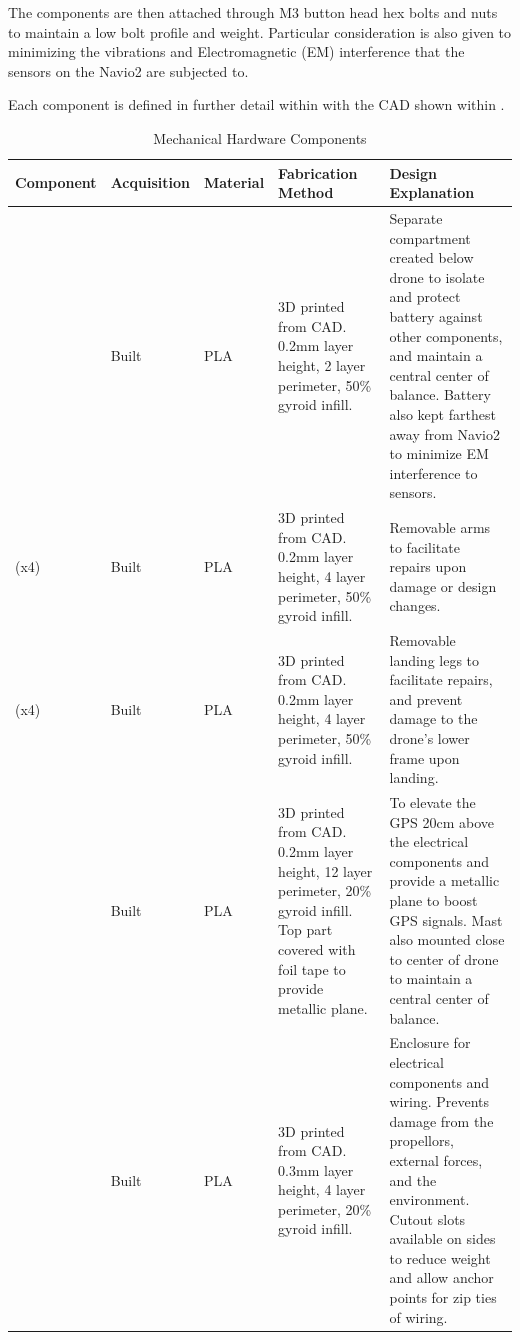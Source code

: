\documentclass[12pt, titlepage]{article}
\begin{document}
The components are then attached through M3 button head hex bolts and nuts to maintain a low bolt profile and weight.
Particular consideration is also given to minimizing the vibrations and Electromagnetic (EM) interference that the sensors on the Navio2 are subjected to.

Each component is defined in further detail within  with the CAD shown within .

\begin{landscape}
\begin{table}[!h]
\begin{center}
\caption {Mechanical Hardware Components}
\label{tab:MechHardware}
\begin{tabular}{ | m{2.7cm} | m{1.9cm} | m{1.4cm} | m{5.5cm} | m{10.3cm} | } 
\hline
Component & Acquisition & Material & Fabrication Method & Design Explanation \\
\hline
\nameref{Battery Compartment} & Built & PLA & 3D printed from CAD. 0.2mm layer height, 2 layer perimeter, 50\% gyroid infill. & 
    Separate compartment created below drone to isolate and protect battery against other components, and maintain a central center of balance. Battery also kept farthest away from Navio2 to minimize EM interference to sensors. \\
\hline
\nameref{Frame Arm} (x4) & Built & PLA & 3D printed from CAD. 0.2mm layer height, 4 layer perimeter, 50\% gyroid infill. & 
    Removable arms to facilitate repairs upon damage or design changes. \\
\hline
\nameref{Landing Leg} (x4) & Built & PLA & 3D printed from CAD. 0.2mm layer height, 4 layer perimeter, 50\% gyroid infill. & 
    Removable landing legs to facilitate repairs, and prevent damage to the drone's lower frame upon landing. \\
\hline
\nameref{GPS Mast} & Built & PLA & 3D printed from CAD. 0.2mm layer height, 12 layer perimeter, 20\% gyroid infill. Top part covered with foil tape to provide metallic plane. & 
    To elevate the GPS 20cm above the electrical components and provide a metallic plane to boost GPS signals. Mast also mounted close to center of drone to maintain a central center of balance. \\
\hline
\nameref{Enclosure} & Built & PLA & 3D printed from CAD. 0.3mm layer height, 4 layer perimeter, 20\% gyroid infill. & 
    Enclosure for electrical components and wiring. Prevents damage from the propellors, external forces, and the environment. Cutout slots available on sides to reduce weight and allow anchor points for zip ties of wiring. \\

\end{tabular}
\end{center}
\end{table}
\end{landscape}
\end{document}
